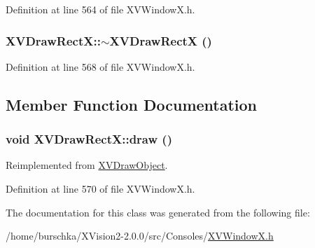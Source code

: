 Definition at line 564 of file XVWindow\-X.h.\label{XVDrawRectX_a1}
\hypertarget{class_XVDrawRectX_a1}{
\subsubsection[~XVDrawRectX]{\setlength{\rightskip}{0pt plus 5cm}XVDraw\-Rect\-X::$\sim$XVDraw\-Rect\-X ()}}




Definition at line 568 of file XVWindow\-X.h.

\subsection{Member Function Documentation}
\label{XVDrawRectX_a2}
\hypertarget{class_XVDrawRectX_a2}{
\subsubsection[draw]{\setlength{\rightskip}{0pt plus 5cm}void XVDraw\-Rect\-X::draw ()}}




Reimplemented from \hyperlink{class_XVDrawObject}{XVDraw\-Object}.

Definition at line 570 of file XVWindow\-X.h.

The documentation for this class was generated from the following file:\begin{CompactItemize}
\item 
/home/burschka/XVision2-2.0.0/src/Consoles/\hyperlink{XVWindowX.h-source}{XVWindow\-X.h}\end{CompactItemize}
